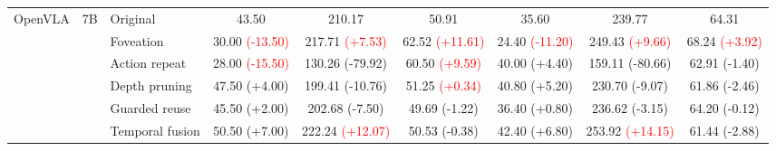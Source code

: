 \begin{table}[t]
\begin{tabular}{cclcccccc}
\multirow[c]{6}{*}{OpenVLA}
& \multirow[c]{6}{*}{7B}
& Original & 43.50 & 210.17 & 50.91 & 35.60 & 239.77 & 64.31 \\
& & Foveation & 30.00 {\scriptsize\textcolor{red}{(-13.50)}} & 217.71 {\scriptsize\textcolor{red}{(+7.53)}} & 62.52 {\scriptsize\textcolor{red}{(+11.61)}} & 24.40 {\scriptsize\textcolor{red}{(-11.20)}} & 249.43 {\scriptsize\textcolor{red}{(+9.66)}} & 68.24 {\scriptsize\textcolor{red}{(+3.92)}} \\
& & Action repeat & 28.00 {\scriptsize\textcolor{red}{(-15.50)}} & 130.26 {\scriptsize\textcolor{green!50!black}{(-79.92)}} & 60.50 {\scriptsize\textcolor{red}{(+9.59)}} & 40.00 {\scriptsize\textcolor{green!50!black}{(+4.40)}} & 159.11 {\scriptsize\textcolor{green!50!black}{(-80.66)}} & 62.91 {\scriptsize\textcolor{green!50!black}{(-1.40)}} \\
& & Depth pruning & 47.50 {\scriptsize\textcolor{green!50!black}{(+4.00)}} & 199.41 {\scriptsize\textcolor{green!50!black}{(-10.76)}} & 51.25 {\scriptsize\textcolor{red}{(+0.34)}} & 40.80 {\scriptsize\textcolor{green!50!black}{(+5.20)}} & 230.70 {\scriptsize\textcolor{green!50!black}{(-9.07)}} & 61.86 {\scriptsize\textcolor{green!50!black}{(-2.46)}} \\
& & Guarded reuse & 45.50 {\scriptsize\textcolor{green!50!black}{(+2.00)}} & 202.68 {\scriptsize\textcolor{green!50!black}{(-7.50)}} & 49.69 {\scriptsize\textcolor{green!50!black}{(-1.22)}} & 36.40 {\scriptsize\textcolor{green!50!black}{(+0.80)}} & 236.62 {\scriptsize\textcolor{green!50!black}{(-3.15)}} & 64.20 {\scriptsize\textcolor{green!50!black}{(-0.12)}} \\
& & Temporal fusion & 50.50 {\scriptsize\textcolor{green!50!black}{(+7.00)}} & 222.24 {\scriptsize\textcolor{red}{(+12.07)}} & 50.53 {\scriptsize\textcolor{green!50!black}{(-0.38)}} & 42.40 {\scriptsize\textcolor{green!50!black}{(+6.80)}} & 253.92 {\scriptsize\textcolor{red}{(+14.15)}} & 61.44 {\scriptsize\textcolor{green!50!black}{(-2.88)}} \\
\cmidrule(lr){1-9}


\end{tabular}
\end{table}
